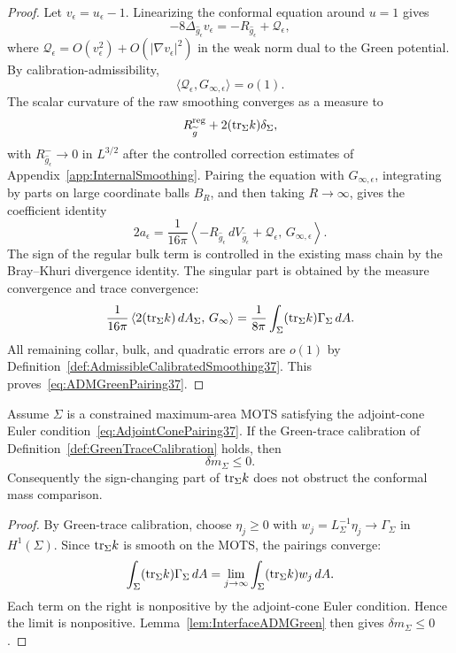 \begin{proof}
Let \(v_\epsilon=u_\epsilon-1\). Linearizing the conformal equation around \(u=1\) gives
\[
    -8\Delta_{\hat g_\epsilon}v_\epsilon
    =
    -R_{\hat g_\epsilon}+ \mathcal Q_\epsilon,
\]
where \(\mathcal Q_\epsilon=O(v_\epsilon^2)+O(|\nabla v_\epsilon|^2)\) in the weak norm dual to the Green potential. By calibration-admissibility,
\[
    \langle \mathcal Q_\epsilon,G_{\infty,\epsilon}\rangle=o(1).
\]
The scalar curvature of the raw smoothing converges as a measure to
\[
    R_{\widetilde{g}}^{\mathrm{reg}}+2(\mathrm{tr}_\Sigma k)\delta_\Sigma,
\]
with \(R_{\hat g_\epsilon}^-\to0\) in \(L^{3/2}\) after the controlled correction estimates of Appendix~\ref{app:InternalSmoothing}. Pairing the equation with \(G_{\infty,\epsilon}\), integrating by parts on large coordinate balls \(B_R\), and then taking \(R\to\infty\), gives the coefficient identity
\[
    2a_\epsilon
    =
    \frac1{16\pi}
    \left\langle -R_{\hat g_\epsilon}\,dV_{\hat g_\epsilon}
    +\mathcal Q_\epsilon,\,
    G_{\infty,\epsilon}\right\rangle .
\]
The sign of the regular bulk term is controlled in the existing mass chain by the Bray--Khuri divergence identity. The singular part is obtained by the measure convergence and trace convergence:
\[
    \frac1{16\pi}
    \left\langle
        2(\mathrm{tr}_\Sigma k)\,dA_\Sigma,\,
        G_\infty
    \right\rangle
    =
    \frac1{8\pi}
    \int_\Sigma(\mathrm{tr}_\Sigma k)\Gamma_\Sigma\,dA .
\]
All remaining collar, bulk, and quadratic errors are \(o(1)\) by Definition~\ref{def:AdmissibleCalibratedSmoothing37}. This proves~\eqref{eq:ADMGreenPairing37}.
\end{proof}

\begin{proposition}\label{prop:AdjointConeCompensation}
Assume \(\Sigma\) is a constrained maximum-area MOTS satisfying the adjoint-cone Euler condition~\eqref{eq:AdjointConePairing37}. If the Green-trace calibration of Definition~\ref{def:GreenTraceCalibration} holds, then
\[
    \delta m_\Sigma\le0.
\]
Consequently the sign-changing part of \(\mathrm{tr}_\Sigma k\) does not obstruct the conformal mass comparison.
\end{proposition}

\begin{proof}
By Green-trace calibration, choose \(\eta_j\ge0\) with \(w_j=L_\Sigma^{-1}\eta_j\to\Gamma_\Sigma\) in \(H^1(\Sigma)\). Since \(\mathrm{tr}_\Sigma k\) is smooth on the MOTS, the pairings converge:
\[
    \int_\Sigma(\mathrm{tr}_\Sigma k)\Gamma_\Sigma\,dA
    =
    \lim_{j\to\infty}\int_\Sigma(\mathrm{tr}_\Sigma k)w_j\,dA .
\]
Each term on the right is nonpositive by the adjoint-cone Euler condition. Hence the limit is nonpositive. Lemma~\ref{lem:InterfaceADMGreen} then gives \(\delta m_\Sigma\le0\).
\end{proof}

